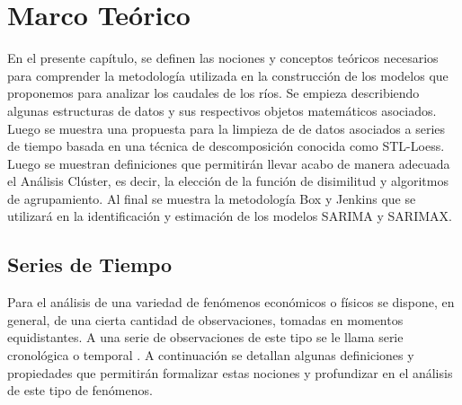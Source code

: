 \documentclass[12pt,oneside]{book}\usepackage[]{graphicx}\usepackage[]{color}
\theoremstyle{definition} %
\begin{document}
\chapter{Marco Teórico}






En el presente capítulo, se definen las nociones y conceptos teóricos necesarios para comprender la metodología utilizada en la construcción de los modelos que proponemos para analizar los caudales de los ríos. Se empieza describiendo algunas estructuras de datos y sus respectivos objetos matemáticos asociados. Luego se muestra una propuesta para la limpieza de de datos asociados a series de tiempo basada en una técnica de descomposición conocida como STL-Loess. Luego se muestran definiciones que permitirán llevar acabo de manera adecuada el Análisis Clúster, es decir, la elección de la función de disimilitud y algoritmos de agrupamiento. Al final se muestra la metodología Box y Jenkins que se utilizará en la identificación y estimación de los modelos SARIMA y SARIMAX.


\section{Series de Tiempo}

Para el análisis de una variedad de fenómenos económicos o físicos se dispone, en general, de una cierta cantidad de observaciones, tomadas en momentos equidistantes. A una serie de observaciones de este tipo se le llama serie cronológica o temporal \cite{capa2016seriest}.
A continuación se detallan algunas definiciones y propiedades que permitirán formalizar estas nociones y profundizar en el análisis de este tipo de fenómenos.
\end{document}
